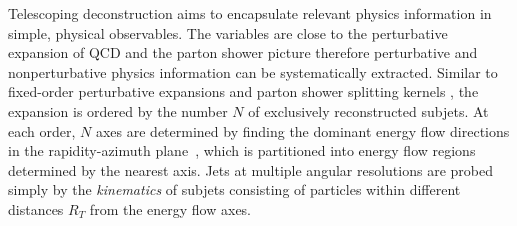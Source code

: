 \documentclass[notoc]{JHEP3}
\begin{document}
Telescoping deconstruction aims to encapsulate relevant physics information in simple, physical observables. The variables are close to the perturbative expansion of QCD and the parton shower picture therefore perturbative and nonperturbative physics information can be systematically extracted. Similar to fixed-order perturbative expansions and parton shower splitting kernels \cite{Nagy:2017ggp}, the expansion is ordered by the number $N$ of exclusively reconstructed subjets. At each order, $N$ axes are determined by finding the dominant energy flow directions in the rapidity-azimuth plane~\cite{Stewart:2010tn,Chien:2013kca,Stewart:2015waa,Thaler:2015xaa}, which is partitioned into energy flow regions determined by the nearest axis. Jets at multiple angular resolutions are probed simply by the {\sl kinematics} of subjets consisting of particles within different distances $R_T$ from the energy flow axes.
\end{document}
